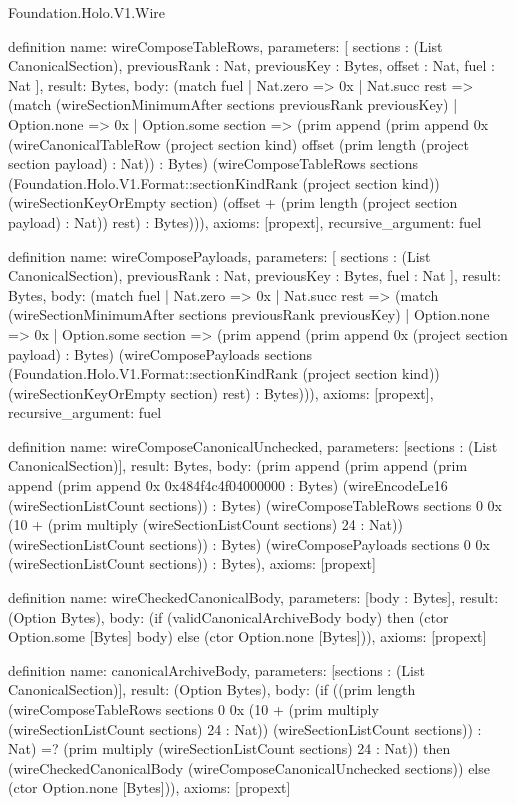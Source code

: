 \begin{lexlean}{Foundation.Holo.V1.Wire}
\begin{semanticmodule}
definition{
  name: wireComposeTableRows,
  parameters: [
    sections : (List CanonicalSection),
    previousRank : Nat,
    previousKey : Bytes,
    offset : Nat,
    fuel : Nat
  ],
  result: Bytes,
  body: (match fuel
    | Nat.zero => 0x
    | Nat.succ rest => (match (wireSectionMinimumAfter sections previousRank previousKey)
      | Option.none => 0x
      | Option.some section => (prim append (prim append 0x (wireCanonicalTableRow (project section kind) offset (prim length (project section payload) : Nat)) : Bytes) (wireComposeTableRows sections (Foundation.Holo.V1.Format::sectionKindRank (project section kind)) (wireSectionKeyOrEmpty section) (offset + (prim length (project section payload) : Nat)) rest) : Bytes))),
  axioms: [propext],
  recursive_argument: fuel
}

definition{
  name: wireComposePayloads,
  parameters: [
    sections : (List CanonicalSection),
    previousRank : Nat,
    previousKey : Bytes,
    fuel : Nat
  ],
  result: Bytes,
  body: (match fuel
    | Nat.zero => 0x
    | Nat.succ rest => (match (wireSectionMinimumAfter sections previousRank previousKey)
      | Option.none => 0x
      | Option.some section => (prim append (prim append 0x (project section payload) : Bytes) (wireComposePayloads sections (Foundation.Holo.V1.Format::sectionKindRank (project section kind)) (wireSectionKeyOrEmpty section) rest) : Bytes))),
  axioms: [propext],
  recursive_argument: fuel
}

definition{
  name: wireComposeCanonicalUnchecked,
  parameters: [sections : (List CanonicalSection)],
  result: Bytes,
  body: (prim append (prim append (prim append (prim append 0x 0x484f4c4f04000000 : Bytes) (wireEncodeLe16 (wireSectionListCount sections)) : Bytes) (wireComposeTableRows sections 0 0x (10 + (prim multiply (wireSectionListCount sections) 24 : Nat)) (wireSectionListCount sections)) : Bytes) (wireComposePayloads sections 0 0x (wireSectionListCount sections)) : Bytes),
  axioms: [propext]
}

definition{
  name: wireCheckedCanonicalBody,
  parameters: [body : Bytes],
  result: (Option Bytes),
  body: (if (validCanonicalArchiveBody body) then (ctor Option.some [Bytes] body) else (ctor Option.none [Bytes])),
  axioms: [propext]
}

definition{
  name: canonicalArchiveBody,
  parameters: [sections : (List CanonicalSection)],
  result: (Option Bytes),
  body: (if ((prim length (wireComposeTableRows sections 0 0x (10 + (prim multiply (wireSectionListCount sections) 24 : Nat)) (wireSectionListCount sections)) : Nat) =? (prim multiply (wireSectionListCount sections) 24 : Nat)) then (wireCheckedCanonicalBody (wireComposeCanonicalUnchecked sections)) else (ctor Option.none [Bytes])),
  axioms: [propext]
}


\end{semanticmodule}
\end{lexlean}
